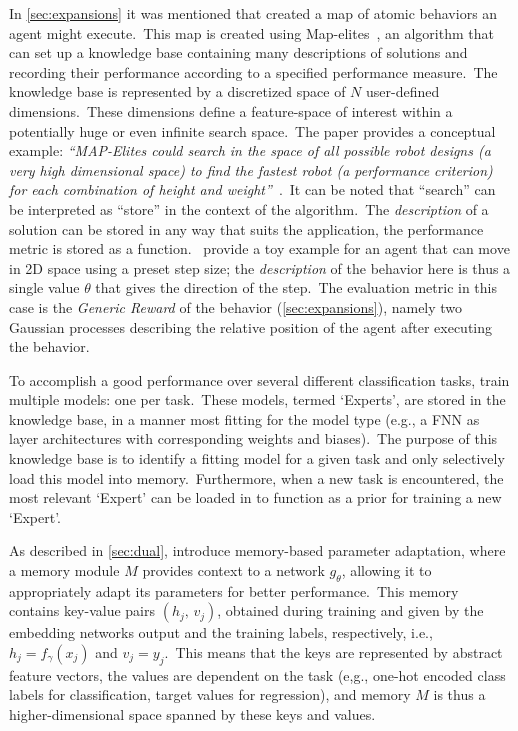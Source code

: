 In \cref{sec:expansions} it was mentioned that \textcite{Chatzilygeroudis2016} created a map of atomic behaviors an agent might execute.\ This map is created using Map-elites~\cite{Mouret2015}, an algorithm that can set up a knowledge base containing many descriptions of solutions and recording their performance according to a specified performance measure.\ The knowledge base is represented by a discretized space of $N$ user-defined dimensions.\ These dimensions define a feature-space of interest within a potentially huge or even infinite search space.\ The paper provides a conceptual example: \emph{``MAP-Elites could search in the space of all possible robot designs (a very high dimensional space) to find the fastest robot (a performance criterion) for each combination of height and weight''}~\cite{Mouret2015}.\ It can be noted that ``search'' can be interpreted as ``store'' in the context of the algorithm.\ The \emph{description} of a solution can be stored in any way that suits the application, the performance metric is stored as a function.\ \textcite{Chatzilygeroudis2016} provide a toy example for an agent that can move in 2D space using a preset step size; the \emph{description} of the behavior here is thus a single value $\theta$ that gives the direction of the step.\ The evaluation metric in this case is the \emph{Generic Reward} of the behavior (\cref{sec:expansions}), namely two Gaussian processes describing the relative position of the agent after executing the behavior.

To accomplish a good performance over several different classification tasks, \textcite{Aljundi2016} train multiple models: one per task.\ These models, termed `Experts', are stored in the knowledge base, in a manner most fitting for the model type (e.g., a FNN as layer architectures with corresponding weights and biases).\ The purpose of this knowledge base is to identify a fitting model for a given task and only selectively load this model into memory.\ Furthermore, when a new task is encountered, the most relevant `Expert' can be loaded in to function as a prior for training a new `Expert'.

As described in \cref{sec:dual}, \textcite{Sprechmann2018} introduce memory-based parameter adaptation, where a memory module $M$ provides context to a network $g_\theta$, allowing it to appropriately adapt its parameters for better performance.\ This memory contains key-value pairs $(h_j,\,v_j)$, obtained during training and given by the embedding networks output and the training labels, respectively, i.e., $h_j = f_{\gamma}(x_j)$ and $v_j = y_j$.\ This means that the keys are represented by abstract feature vectors, the values are dependent on the task (e,g., one-hot encoded class labels for classification, target values for regression), and memory $M$ is thus a higher-dimensional space spanned by these keys and values.\

